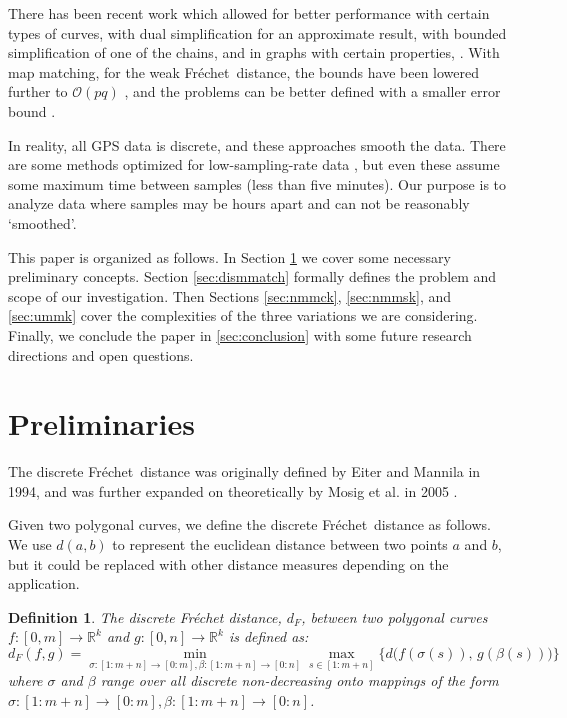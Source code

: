 \documentclass{article}[11pt]
\newcommand{\frechet}{Fr\'echet}
\newcommand{\dfre}{d_F}
\newcommand{\dist}{\mathit{d}}
\newcommand{\BO}{\mathcal{O}}
\newtheorem{definition}{Definition}
\begin{document}
There has been recent work which allowed for better performance with certain types
of curves, with dual simplification for an approximate result, with bounded simplification
of one of the chains, and in graphs with certain properties, \cite{Brakatsoulas:2005:VLDB,Buchin:2009:SODA,Chen:2011:ALENEX,Driemel:2012:DCG}.
With map matching, for the weak \frechet\ distance, the bounds have been lowered further to
$\BO(pq)$ \cite{Chen:2008:UP}, and the problems can be better defined with a smaller error bound
\cite{Wenk:2006:SSDBM}. 


In reality, all GPS data is discrete, and these approaches smooth the data.  There are some
methods optimized for low-sampling-rate data \cite{Lou:2009:GIS}, but even these assume
some maximum time between samples (less than five minutes).  Our purpose is to analyze 
data where samples may be hours apart and can not be reasonably `smoothed'. 

This paper is organized as follows. In Section \ref{sec:preliminaries} we cover some necessary
preliminary concepts. Section \ref{sec:dismmatch} formally defines the problem and scope of
our investigation. Then Sections \ref{sec:nmmck}, \ref{sec:nmmsk}, and \ref{sec:ummk} cover the
complexities of the three variations we are considering.  
Finally, we conclude the paper in \ref{sec:conclusion} with some future research directions and open questions.




\section{Preliminaries} \label{sec:preliminaries}


The discrete \frechet\ distance was originally defined by Eiter and Mannila \cite{Eiter:1994:TECH} 
in 1994, and was further expanded on theoretically by Mosig et al. in 2005 \cite{Mosig:2005:CGTA}.

Given two polygonal curves, we define the discrete \frechet\ distance as follows.
We use $\dist(a,b)$ to represent the
euclidean distance between two points $a$ and $b$, but it could be
replaced with other distance measures depending on the application. 

\begin{definition} \label{def:dfdformal}
    The discrete Fr\'echet distance, $\dfre$, between two polygonal curves $f:[0,m] \rightarrow \mathbb{R}^k$ and $g:[0,n] \rightarrow \mathbb{R}^k$ is defined as:
    \[
    \dfre(f,g) = \min_{\sigma:[1:m+n]\rightarrow[0:m], \beta:[1:m+n]\rightarrow[0:n]}\max_{s \in [1:m+n]} \Bigg \{d \Big ( f(\sigma(s)), \, g(\beta(s)) \Big ) \Bigg \}
    \]
    where $\sigma$ and $\beta$ range over all discrete non-decreasing onto mappings of the form $\sigma:[1:m+n]\rightarrow[0:m], \beta:[1:m+n]\rightarrow[0:n]$.
\end{definition}
\end{document}
